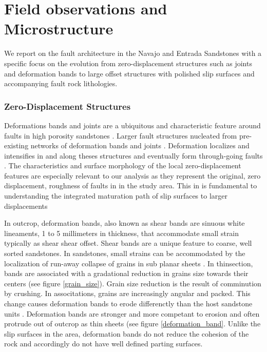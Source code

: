 \documentclass[12pt,a4paper]{article}
\begin{document}
\section{Field observations and Microstructure}

We report on the fault architecture in the Navajo and Entrada Sandstones with a specific focus on the evolution from zero-displacement structures such as joints and deformation bands to large offset structures with polished slip surfaces and accompanying fault rock lithologies.

\subsubsection{Zero-Displacement Structures}

Deformations bands and joints are a ubiquitous and characteristic feature around faults in high porosity sandstones \cite{fossen2007deformation} \cite{davatzes2003overprinting}. Larger fault structures nucleated from pre-existing networks of deformation bands and joints \cite{davatzes2003overprinting}. Deformation localizes and intensifies in and along theses structures and eventually form through-going faults \cite{aydin1977faulting}. The characteristics and surface morphology of the local zero-displacement features are especially relevant to our analysis as they represent the original, zero displacement, roughness of faults in in the study area. This in is fundamental to understanding the integrated maturation path of slip surfaces to larger displacements

In outcrop, deformation bands, also known as shear bands are sinuous white lineaments, 1 to 5 millimeters in thickness, that accommodate small strain typically as shear shear offset. Shear bands are a unique feature to coarse, well sorted sandstones. In sandstones, small strains can be accommodated by the localization of run-away collapse of grains in sub planar sheets \cite{fossen2007deformation}. In thinsection, bands are associated with a gradational reduction in grains size towards their centers (see figure \ref{grain_size}). Grain size reduction is the result of comminution by crushing. In associtations, grains are increasingly angular and packed. This change causes deformation bands to erode differenctly than the host sandstone units \cite{fossen2007deformation}. Deformation bands are stronger and more competant to erosion and often protrude out of outcrop as thin sheets (see figure \ref{deformation_band}. Unlike the slip surfaces in the area, deformation bands do not reduce the cohesion of the rock and accordingly do not have well defined parting surfaces. 
\end{document}
